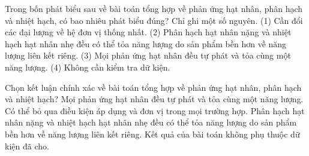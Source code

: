 \begin{ex}
Trong bốn phát biểu sau về bài toán tổng hợp về phản ứng hạt nhân, phân hạch và nhiệt hạch, có bao nhiêu phát biểu đúng? Chỉ ghi một số nguyên. (1) Cần đổi các đại lượng về hệ đơn vị thống nhất. (2) Phân hạch hạt nhân nặng và nhiệt hạch hạt nhân nhẹ đều có thể tỏa năng lượng do sản phẩm bền hơn về năng lượng liên kết riêng. (3) Mọi phản ứng hạt nhân đều tự phát và tỏa cùng một năng lượng. (4) Không cần kiểm tra dữ kiện.
\end{ex}

\begin{ex}
Chọn kết luận chính xác về bài toán tổng hợp về phản ứng hạt nhân, phân hạch và nhiệt hạch?
\choice
{Mọi phản ứng hạt nhân đều tự phát và tỏa cùng một năng lượng.}
{Có thể bỏ qua điều kiện áp dụng và đơn vị trong mọi trường hợp.}
{\True Phân hạch hạt nhân nặng và nhiệt hạch hạt nhân nhẹ đều có thể tỏa năng lượng do sản phẩm bền hơn về năng lượng liên kết riêng.}
{Kết quả của bài toán không phụ thuộc dữ kiện đã cho.}
\end{ex}

